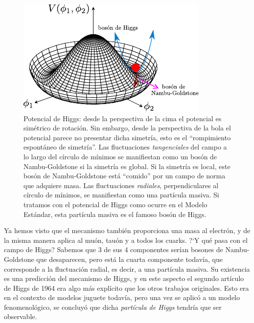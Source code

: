 \begin{figure}
\vspace*{-5mm}
	\begin{center}
	\includegraphics[scale=2]{images/higgspotential.pdf}
	\end{center}
	\caption{Potencial de Higgs: desde la perspectiva de la
        cima el potencial es sim\'etrico de rotaci\'on.
        Sin embargo, desde la perspectiva de la bola el potencial
        parece no presentar dicha simetr\'ia, esto es el ``rompimiento
        espont\'aneo de simetr\'ia''. Las fluctuaciones {\em tangenciales}
        del campo a lo largo del c\'irculo de m\'inimos se manifiestan
        como un bos\'on de Nambu-Goldstone si la simetr\'ia es global.
        Si la simetr\'ia es local, este bos\'on de Nambu-Goldstone
        est\'a ``comido'' por un campo de norma que adquiere masa. Las
        fluctuaciones {\em radiales}, perpendiculares al c\'irculo de
        m\'inimos, se manifiestan como una part\'icula masiva. Si
        tratamos con el potencial de Higgs como ocurre en el Modelo
        Est\'andar, esta part\'icula masiva es el famoso bos\'on de
        Higgs.}
\label{sombrero}        
\vspace*{-2mm}
\end{figure}

Ya hemos visto que el mecanismo tambi\'en proporciona una masa al
electr\'on, y de la misma manera aplica al mu\'on, tau\'on y a
todos los cuarks. ?`Y qu\'e pasa con el campo de Higgs?
Sabemos que 3 de sus 4 componentes ser\'ian bosones de
Nambu-Goldstone que desaparecen, pero est\'a la cuarta componente
todav\'ia, que corresponde a la fluctuaci\'on radial, es decir,
a una part\'icula masiva. Su existencia es una predicci\'on del
mecanismo de Higgs, y en este aspecto el segundo art\'iculo de Higgs
de 1964 era algo m\'as expl\'icito que los otros trabajos originales.
Esto era en el contexto de modelos juguete todav\'ia, pero una vez se
aplic\'o a un modelo fenomenol\'ogico, se concluy\'o que dicha
{\em part\'icula de Higgs} tendr\'ia que ser observable. 

